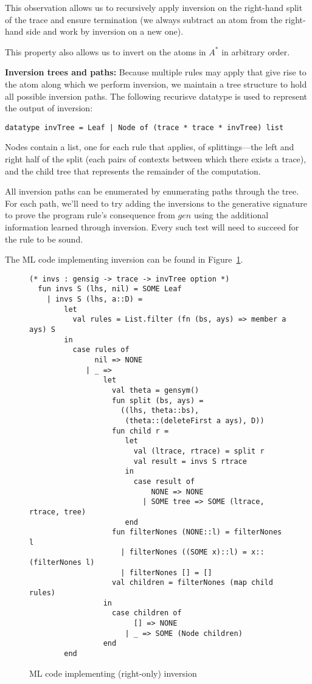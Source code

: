 \documentclass[fullpage, 11pt]{article}
\begin{document}
This observation allows us to recursively apply inversion on the right-hand
split of the trace and ensure termination (we always subtract an atom from
the right-hand side and work by inversion on a new one).

This property also allows us to invert on the atoms in $A^*$ in arbitrary
order.

{\bf Inversion trees and paths:} Because multiple rules may apply that give
rise to the atom along which we perform inversion, we maintain a tree
structure to hold all possible inversion paths.
The following recurisve datatype is used to represent the output of
inversion:

\begin{verbatim}
datatype invTree = Leaf | Node of (trace * trace * invTree) list
\end{verbatim}

Nodes contain a list, one for each rule that applies, of splittings---the
left and right half of the split (each pairs of contexts between which
there exists a trace), and the child tree that represents the remainder of
the computation.

All inversion paths can be enumerated by enumerating paths through the
tree. For each path, we'll need to try adding the inversions to the
generative signature to prove the program rule's consequence from $gen$
using the additional information learned through inversion. Every such test
will need to succeed for the rule to be sound.

The ML code implementing inversion can be found in
Figure~\ref{fig:inversion}.

\begin{figure}[H]
\footnotesize
\begin{verbatim}
(* invs : gensig -> trace -> invTree option *)
  fun invs S (lhs, nil) = SOME Leaf
    | invs S (lhs, a::D) =
        let 
          val rules = List.filter (fn (bs, ays) => member a ays) S
        in  
          case rules of
               nil => NONE
             | _ =>
                 let 
                   val theta = gensym()
                   fun split (bs, ays) = 
                     ((lhs, theta::bs), 
                      (theta::(deleteFirst a ays), D)) 
                   fun child r = 
                      let 
                        val (ltrace, rtrace) = split r
                        val result = invs S rtrace
                      in  
                        case result of
                            NONE => NONE
                          | SOME tree => SOME (ltrace, rtrace, tree)
                      end 
                   fun filterNones (NONE::l) = filterNones l
                     | filterNones ((SOME x)::l) = x::(filterNones l)
                     | filterNones [] = []
                   val children = filterNones (map child rules)
                 in  
                   case children of
                        [] => NONE
                      | _ => SOME (Node children)
                 end 
        end 
\end{verbatim}
\caption{ML code implementing (right-only) inversion}
\label{fig:inversion}
\end{figure}
\end{document}
